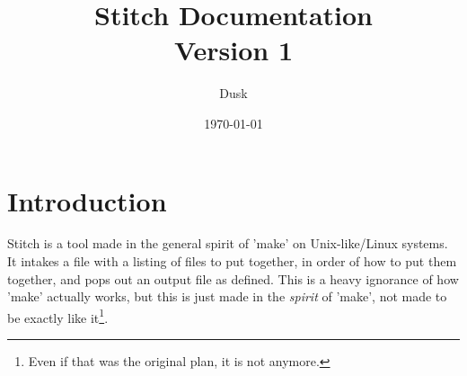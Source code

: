 \documentclass{report}
\title{Stitch Documentation \\ \large Version 1}
\author{Dusk}
\date{\today}
\begin{document}
\maketitle

\section*{Introduction}
\hspace{12pt}
Stitch is a tool made in the general spirit of 'make' on Unix-like/Linux systems. It intakes a file with a listing of files to put together, in order of how to put them together, and pops out an output file as defined. This is a heavy ignorance of how 'make' actually works, but this is just made in the \textit{spirit} of 'make', not made to be exactly like it\footnote{Even if that was the original plan, it is not anymore.}.
\end{document}
